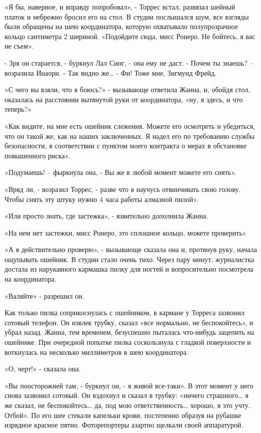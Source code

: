 \documentclass[10pt,final]{book}
\begin{document}
«Я бы, наверное, и вправду попробовал», - Торрес встал, развязал шейный платок и небрежно бросил его на стол. В студии послышался шум, все взгляды были обращены на шею координатора, которую охватывало полупрозрачное кольцо сантиметра 2 шириной. «Подойдите сюда, мисс Ронеро. Не бойтесь, я вас не съем».

- Зря он старается, - буркнул Лал Синг, - она ему не даст.
- Почем ты знаешь? -- возразила Инаори.
- Так видно же\ldots{}
- Фи! Тоже мне, Зигмунд Фрейд.

«С чего вы взяли, что я боюсь?» - вызывающе ответила Жанна, и, обойдя стол, оказалась на расстоянии вытянутой руки от координатора, «ну, я здесь, и что теперь?»

«Как видите, на мне есть ошейник слежения. Можете его осмотреть и убедиться, что он такой же, как на наших заключенных. Я надел его по требованию службы безопасности, в соответствии с пунктом моего контракта о мерах в обстановке повышенного риска».

«Подумаешь! -- фыркнула она, - Вы же в любой момент можете его снять».

«Вряд ли, - возразил Торрес, - разве что я научусь отвинчивать свою голову. Чтобы снять эту штуку нужно 4 часа работы алмазной пилой».

«Или просто знать, где застежка», - язвительно дополнила Жанна.

«На нем нет застежки, мисс Ронеро, это сплошное кольцо, можете проверить»

«А я действительно проверю», - вызывающе сказала она и, протянув руку, начала ощупывать ошейник. В студии стало очень тихо. Через пару минут, журналистка достала из нарукавного кармашка пилку для ногтей и вопросительно посмотрела на координатора.

«Валяйте» - разрешил он.

Как только пилка соприкоснулась с ошейником, в кармане у Торреса зазвонил сотовый телефон. Он извлек трубку, сказал «все нормально, не беспокойтесь», и убрал назад.
Жанна, тем временем, безуспешно пыталась что-нибудь зацепить на ошейнике. При очередной попытке пилка соскользнула с гладкой поверхности и воткнулась на несколько миллиметров в шею координатора.

«О, черт!» - сказала она.

«Вы поосторожней там, - буркнул он, - я живой все-таки». В этот момент у него снова зазвонил сотовый. Он вздохнул и сказал в трубку: «ничего страшного\ldots{} я же сказал, не беспокойтесь\ldots{} да, под мою ответственность\ldots{} хорошо, я это учту. Отбой».
По его шее стекали капельки крови, постепенно образуя на рубашке изрядное красное пятно. Фоторепортеры азартно щелкали своей аппаратурой.
\end{document}
